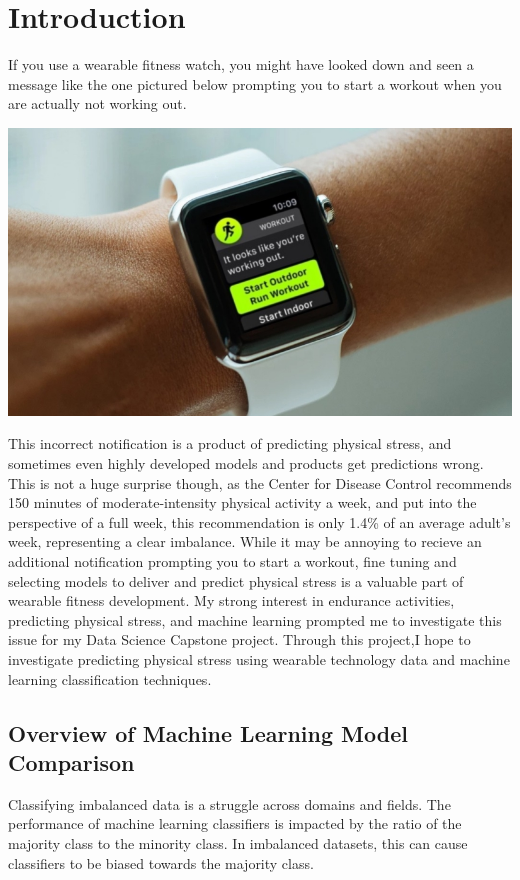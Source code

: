 \documentclass{article}
\begin{document}
\section{Introduction}
If you use a wearable fitness watch, you might have looked down and seen a message like the one pictured below prompting you to start a workout when you are actually not working out. 
\begin{center}
    \includegraphics[scale = .28]{images/Apple_Watch_Workput_Detection_banner-800x457.jpeg}
    \cite{appleWatch}
\end{center}
This incorrect notification is a product of predicting physical stress, and sometimes even highly developed models and products get predictions wrong. This is not a huge surprise though, as the Center for Disease Control recommends 150 minutes of moderate-intensity physical activity a week, and put into the perspective of a full week, this recommendation is only 1.4\% of an average adult’s week, representing a clear imbalance. While it may be annoying to recieve an additional notification prompting you to start a workout, fine tuning and selecting models to deliver and predict physical stress is a valuable part of wearable fitness development. My strong interest in endurance activities, predicting physical stress, and machine learning prompted me to investigate this issue for my Data Science Capstone project. Through this project,I hope to investigate predicting physical stress using wearable technology data and machine learning classification techniques. 


\subsection{Overview of Machine Learning Model Comparison}

Classifying imbalanced data is a struggle across domains and fields. The performance of machine learning classifiers is impacted by the ratio of the majority class to the minority class. In imbalanced datasets, this can cause classifiers to be biased towards the majority class.
\end{document}
